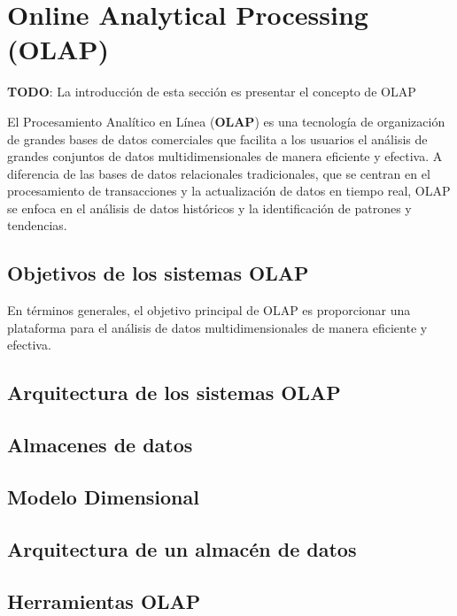 \section{Online Analytical Processing (OLAP)} \label{section:olap}

\textbf{TODO}: La introducci\'on de esta secci\'on es presentar el concepto de OLAP

El Procesamiento Anal\'itico en L\'inea (\textbf{OLAP}) es una tecnología de organización de grandes bases de datos 
comerciales que facilita a los usuarios el an\'alisis de grandes conjuntos de datos multidimensionales de manera 
eficiente y efectiva. A diferencia de las bases de datos relacionales tradicionales, que se centran en el procesamiento 
de transacciones y la actualización de datos en tiempo real, OLAP se enfoca en el análisis de datos históricos y la 
identificación de patrones y tendencias. 

\subsection{Objetivos de los sistemas OLAP}

En términos generales, el objetivo principal de OLAP es proporcionar una plataforma para el análisis de datos 
multidimensionales de manera eficiente y efectiva.

\subsection{Arquitectura de los sistemas OLAP}
\subsection{Almacenes de datos}
\subsection{Modelo Dimensional}
\subsection{Arquitectura de un almac\'en de datos}
\subsection{Herramientas OLAP}
